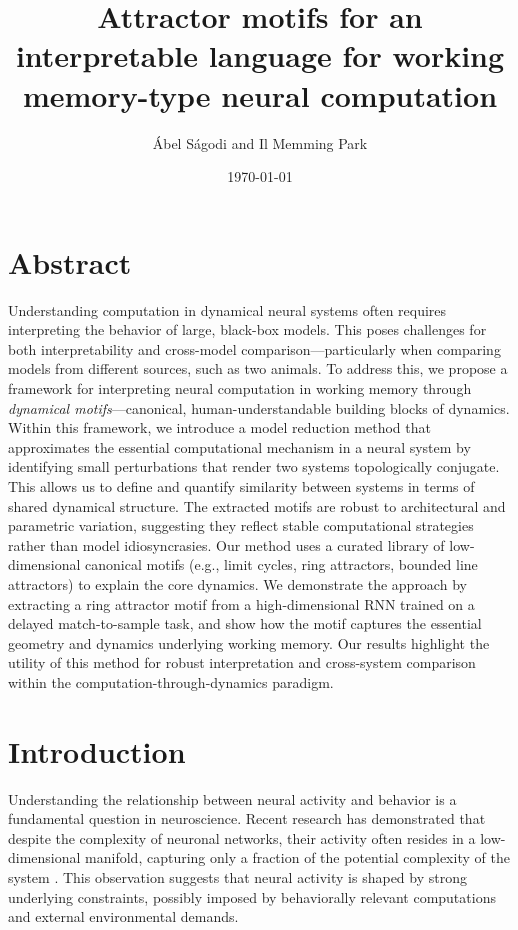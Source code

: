 \documentclass{article}
\title{Attractor motifs for an interpretable language for working memory-type neural computation}
\author{\'Abel S\'agodi and Il Memming Park}
\date{\today}
\theoremstyle{definition} \newtheorem{definition}{Definition}  \newtheorem{example}{Example}
\theoremstyle{remark} \newtheorem{remark}{Remark}
\newcounter{ct}
\begin{document}
\maketitle


\section*{Abstract}

Understanding computation in dynamical neural systems often requires interpreting the behavior of large, black-box models.
This poses challenges for both interpretability and cross-model comparison—particularly when comparing models from different sources, such as two animals.
To address this, we propose a framework for interpreting neural computation in working memory through \emph{dynamical motifs}—canonical, human-understandable building blocks of dynamics.
Within this framework, we introduce a model reduction method that approximates the essential computational mechanism in a neural system by identifying small perturbations that render two systems topologically conjugate.
This allows us to define and quantify similarity between systems in terms of shared dynamical structure.
The extracted motifs are robust to architectural and parametric variation, suggesting they reflect stable computational strategies rather than model idiosyncrasies.
Our method uses a curated library of low-dimensional canonical motifs (e.g., limit cycles, ring attractors, bounded line attractors) to explain the core dynamics.
We demonstrate the approach by extracting a ring attractor motif from a high-dimensional RNN trained on a delayed match-to-sample task, and show how the motif captures the essential geometry and dynamics underlying working memory.
Our results highlight the utility of this method for robust interpretation and cross-system comparison within the computation-through-dynamics paradigm.


\section{Introduction}\label{sec:intro}
Understanding the relationship between neural activity and behavior is a fundamental question in neuroscience.
 Recent research has demonstrated that despite the complexity of neuronal networks, their activity often resides in a low-dimensional manifold, capturing only a fraction of the potential complexity of the system \citep{duncker2021dynamics}.
 This observation suggests that neural activity is shaped by strong underlying constraints, possibly imposed by behaviorally relevant computations and external environmental demands.
\end{document}
